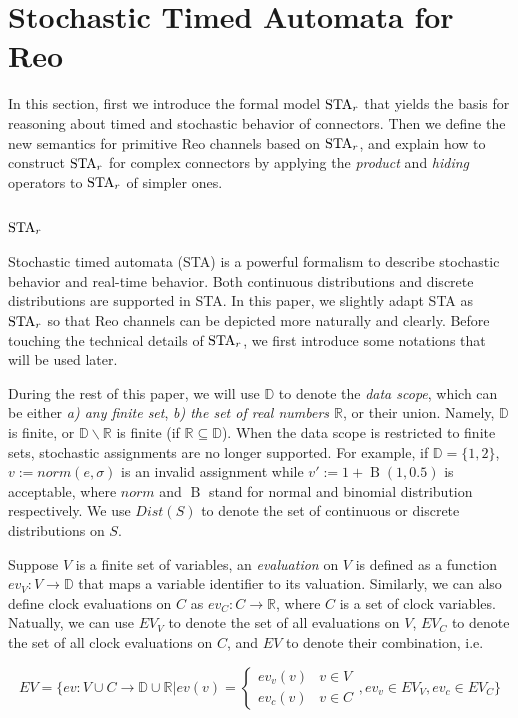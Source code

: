 \section{Stochastic Timed Automata for Reo}
\label{sec:semantics}

In this section, first we introduce the formal model $\mbox{STA}_r$ that yields the basis for reasoning about timed and stochastic behavior of connectors. Then we define the new semantics for primitive Reo channels based on $\mbox{STA}_r$, and explain how to construct $\mbox{STA}_r$ for complex connectors by applying the \emph{product} and \emph{hiding} operators to $\mbox{STA}_r$ of simpler ones.
\subsection{$\mbox{STA}_r$}

Stochastic timed automata (STA) \cite{HahnHH14} is a powerful formalism to describe stochastic behavior and real-time behavior. Both continuous distributions and discrete distributions are supported in STA. In this paper, we slightly adapt STA as $\mbox{STA}_r$ so that Reo channels can be depicted more naturally and clearly.
Before touching the technical details of $\mbox{STA}_r$, we first introduce some notations that will be used later.

During the rest of this paper, we will use $\mathbb{D}$ to denote the \emph{data scope}, which can be either \emph{a) any finite set}, \emph{b) the set of real numbers $\mathbb{R}$}, or their union.
Namely, $\mathbb{D}$ is finite, or $\mathbb{D}\backslash \mathbb{R}$ is finite (if $\mathbb{R}\subseteq \mathbb{D}$).
When the data scope is restricted to finite sets, stochastic assignments are no longer supported. For example, if $\mathbb{D}=\{1,2\}$, $v:=norm(e,\sigma)$ is an invalid assignment while $v':=1+\operatorname{B}(1, 0.5)$ is acceptable, where $norm$ and $\operatorname{B}$ stand for normal and binomial distribution respectively. We use $Dist(S)$ to denote the set of continuous or discrete distributions on $S$.

\begin{definition}[Evaluations]
Suppose $V$ is a finite set of variables, an \emph{evaluation} on $V$ is defined as a function $ev_V:V\rightarrow \mathbb{D}$ that maps a variable identifier to its valuation. Similarly, we can also define clock evaluations on $C$ as $ev_C:C\rightarrow \mathbb{R}$, where $C$ is a set of clock variables. Natually, we can use $EV_V$ to denote the set of all evaluations on $V$, $EV_C$ to denote the set of all clock evaluations on $C$, and $EV$ to denote their combination, i.e. 

\begin{displaymath}
    EV=\Bigg\{ev:V\cup C\rightarrow \mathbb{D}\cup\mathbb{R}|
    ev(v)=
    \left\{
        \begin{array}{lr}
            ev_v(v) & v\in V \\
            ev_c(v) & v\in C
        \end{array}
    \right.
    , ev_v\in EV_V, ev_c\in EV_C
    \Bigg\}
\end{displaymath}

\end{definition}


